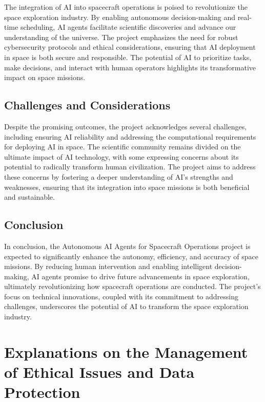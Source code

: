 \documentclass[a4paper,12pt]{article}
\begin{document}
The integration of AI into spacecraft operations is poised to revolutionize the space exploration industry. By enabling autonomous decision-making and real-time scheduling, AI agents facilitate scientific discoveries and advance our understanding of the universe. The project emphasizes the need for robust cybersecurity protocols and ethical considerations, ensuring that AI deployment in space is both secure and responsible. The potential of AI to prioritize tasks, make decisions, and interact with human operators highlights its transformative impact on space missions.

\subsection{Challenges and Considerations}

Despite the promising outcomes, the project acknowledges several challenges, including ensuring AI reliability and addressing the computational requirements for deploying AI in space. The scientific community remains divided on the ultimate impact of AI technology, with some expressing concerns about its potential to radically transform human civilization. The project aims to address these concerns by fostering a deeper understanding of AI's strengths and weaknesses, ensuring that its integration into space missions is both beneficial and sustainable.

\subsection{Conclusion}

In conclusion, the Autonomous AI Agents for Spacecraft Operations project is expected to significantly enhance the autonomy, efficiency, and accuracy of space missions. By reducing human intervention and enabling intelligent decision-making, AI agents promise to drive future advancements in space exploration, ultimately revolutionizing how spacecraft operations are conducted. The project's focus on technical innovations, coupled with its commitment to addressing challenges, underscores the potential of AI to transform the space exploration industry.



\section{Explanations on the Management of Ethical Issues and Data Protection}
\end{document}
